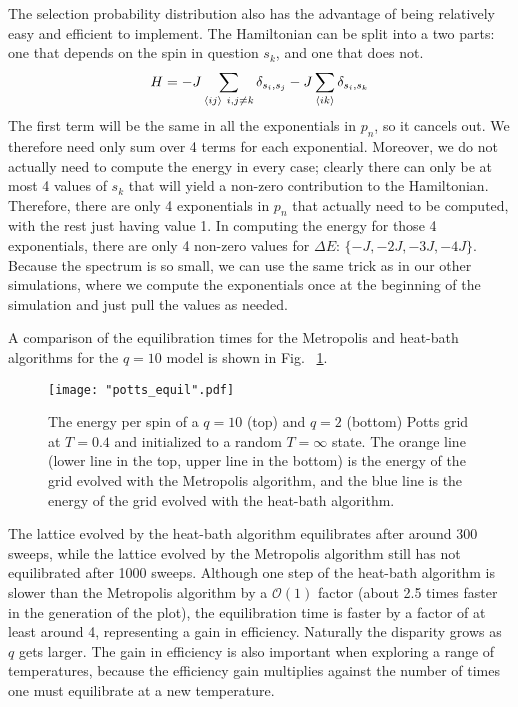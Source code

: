 \documentclass[twocolumn,aps]{revtex4-1} %
\begin{document}
The selection probability distribution also has the advantage of being relatively easy and efficient to implement. The Hamiltonian can be split into a two parts: one that depends on the spin in question $s_k$, and one that does not.
\begin{equation}
	H = -J\sum_{\braket{ij}\ i,j\neq k}\delta_{s_i,s_j} - J\sum_{\braket{ik}}\delta_{s_i,s_k}
\end{equation}
The first term will be the same in all the exponentials in $p_n$, so it cancels out. We therefore need only sum over 4 terms for each exponential. Moreover, we do not actually need to compute the energy in every case; clearly there can only be at most 4 values of $s_k$ that will yield a non-zero contribution to the Hamiltonian. Therefore, there are only 4 exponentials in $p_n$ that actually need to be computed, with the rest just having value 1. In computing the energy for those 4 exponentials, there are only 4 non-zero values for $\Delta E$: $\{-J, -2J, -3J, -4J\}$. Because the spectrum is so small, we can use the same trick as in our other simulations, where we compute the exponentials once at the beginning of the simulation and just pull the values as needed.

A comparison of the equilibration times for the Metropolis and heat-bath algorithms for the $q = 10$ model is shown in Fig.~ \ref{fig:pottsequil}.
\begin{figure}
	\texttt{[image: "potts\_equil".pdf]}
	\caption{\label{fig:pottsequil}The energy per spin of a $q = 10$ (top) and $q = 2$ (bottom) Potts grid at $T = 0.4$ and initialized to a random $T = \infty$ state. The orange line (lower line in the top, upper line in the bottom) is the energy of the grid evolved with the Metropolis algorithm, and the blue line is the energy of the grid evolved with the heat-bath algorithm.}
\end{figure}

The lattice evolved by the heat-bath algorithm equilibrates after around 300 sweeps, while the lattice evolved by the Metropolis algorithm still has not equilibrated after 1000 sweeps. Although one step of the heat-bath algorithm is slower than the Metropolis algorithm by a $\mathcal{O}(1)$ factor (about 2.5 times faster in the generation of the plot), the equilibration time is faster by a factor of at least around 4, representing a gain in efficiency. Naturally the disparity grows as $q$ gets larger. The gain in efficiency is also important when exploring a range of temperatures, because the efficiency gain multiplies against the number of times one must equilibrate at a new temperature.
\end{document}
